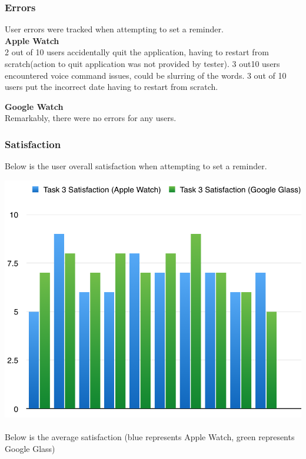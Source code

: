 \documentclass[paper=a4, fontsize=11pt]{scrartcl}	%
\numberwithin{equation}{section}															%
\numberwithin{figure}{section}																%
\numberwithin{table}{section}																%
\begin{document}
\subsubsection{Errors}
User errors were tracked when attempting to set a reminder.\\

\textbf{Apple Watch} \\
2 out of 10 users accidentally quit the application, having to restart from scratch(action to quit application was not provided by tester). 3 out10 users encountered voice command issues, could be slurring of the words. 3 out of 10 users put the incorrect date having to restart from scratch.
 
\textbf{Google Watch}\\
Remarkably, there were no errors for any users.

\subsubsection{Satisfaction}
Below is the user overall satisfaction when attempting to set a reminder.

\includegraphics[scale=0.8]{task3sat}\\ \\

Below is the average satisfaction (blue represents Apple Watch, green represents Google Glass)\\ \\
\end{document}
